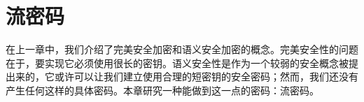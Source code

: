 \chapter{流密码}

在上一章中，我们介绍了完美安全加密和语义安全加密的概念。完美安全性的问题在于，要实现它必须使用很长的密钥。语义安全性是作为一个较弱的安全概念被提出来的，它或许可以让我们建立使用合理的短密钥的安全密码；然而，我们还没有产生任何这样的具体密码。本章研究一种能做到这一点的密码：流密码。















